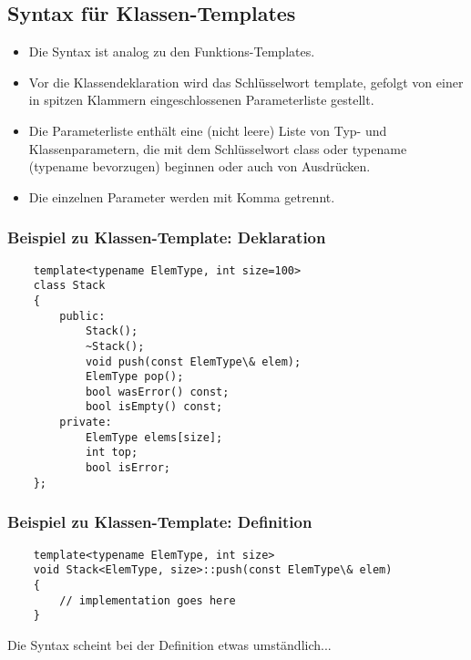 \subsection{Syntax für Klassen-Templates}
\label{sec:Syntax fuer Klassen-Templates}
\begin{itemize}
	\item Die Syntax ist analog zu den Funktions-Templates.
	\item Vor die Klassendeklaration wird das Schlüsselwort template, gefolgt von einer in spitzen Klammern eingeschlossenen Parameterliste gestellt.
	\item Die Parameterliste enthält eine (nicht leere) Liste von Typ- und Klassenparametern, die mit dem Schlüsselwort class oder typename (typename bevorzugen) beginnen oder auch von Ausdrücken.
	\item Die einzelnen Parameter werden mit Komma getrennt.
\end{itemize}

\subsubsection{Beispiel zu Klassen-Template: Deklaration}
\label{sec:Beispiel zu Klassen-Template: Deklaration}
\noindent
\begin{minipage}{\linewidth}
	\begin{lstlisting}
	template<typename ElemType, int size=100>
	class Stack
	{
		public:
			Stack();
			~Stack();
			void push(const ElemType\& elem);
			ElemType pop();
			bool wasError() const;
			bool isEmpty() const;
		private:
			ElemType elems[size];
			int top;
			bool isError;
	};
	\end{lstlisting}
\end{minipage}

\subsubsection{Beispiel zu Klassen-Template: Definition}
\label{sec:Beispiel zu Klassen-Template: Definition}
\noindent
\begin{minipage}{\linewidth}
	\begin{lstlisting}
	template<typename ElemType, int size>
	void Stack<ElemType, size>::push(const ElemType\& elem)
	{
		// implementation goes here
	}
	\end{lstlisting}
\end{minipage}
Die Syntax scheint bei der Definition etwas umständlich...

